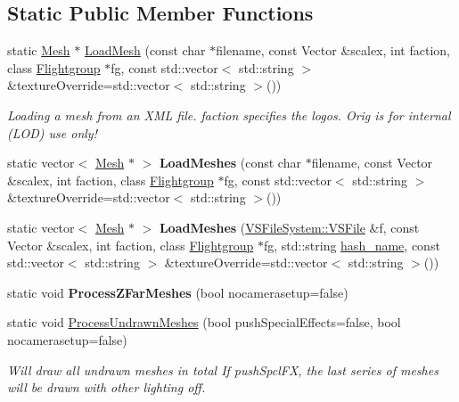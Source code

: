 \subsection*{Static Public Member Functions}
\begin{DoxyCompactItemize}
\item 
static \hyperlink{classMesh}{Mesh} $\ast$ \hyperlink{classMesh_a41fda8d598b4f20153b020c2d3f38839}{Load\+Mesh} (const char $\ast$filename, const Vector \&scalex, int faction, class \hyperlink{classFlightgroup}{Flightgroup} $\ast$fg, const std\+::vector$<$ std\+::string $>$ \&texture\+Override=std\+::vector$<$ std\+::string $>$())\hypertarget{classMesh_a41fda8d598b4f20153b020c2d3f38839}{}\label{classMesh_a41fda8d598b4f20153b020c2d3f38839}

\begin{DoxyCompactList}\small\item\em Loading a mesh from an X\+ML file. faction specifies the logos. Orig is for internal (L\+OD) use only! \end{DoxyCompactList}\item 
static vector$<$ \hyperlink{classMesh}{Mesh} $\ast$ $>$ {\bfseries Load\+Meshes} (const char $\ast$filename, const Vector \&scalex, int faction, class \hyperlink{classFlightgroup}{Flightgroup} $\ast$fg, const std\+::vector$<$ std\+::string $>$ \&texture\+Override=std\+::vector$<$ std\+::string $>$())\hypertarget{classMesh_a53082909aa7539f0b0c244e474d462a1}{}\label{classMesh_a53082909aa7539f0b0c244e474d462a1}

\item 
static vector$<$ \hyperlink{classMesh}{Mesh} $\ast$ $>$ {\bfseries Load\+Meshes} (\hyperlink{classVSFileSystem_1_1VSFile}{V\+S\+File\+System\+::\+V\+S\+File} \&f, const Vector \&scalex, int faction, class \hyperlink{classFlightgroup}{Flightgroup} $\ast$fg, std\+::string \hyperlink{classMesh_a1e30f4793443788927376dd02d7bb918}{hash\+\_\+name}, const std\+::vector$<$ std\+::string $>$ \&texture\+Override=std\+::vector$<$ std\+::string $>$())\hypertarget{classMesh_adf213fba862e7be4ee62d1f683b95105}{}\label{classMesh_adf213fba862e7be4ee62d1f683b95105}

\item 
static void {\bfseries Process\+Z\+Far\+Meshes} (bool nocamerasetup=false)\hypertarget{classMesh_ab7eff87ab1f5a89b4f9aea1b2fc91c2f}{}\label{classMesh_ab7eff87ab1f5a89b4f9aea1b2fc91c2f}

\item 
static void \hyperlink{classMesh_ab00de322e0cefefc7d4948f54d853736}{Process\+Undrawn\+Meshes} (bool push\+Special\+Effects=false, bool nocamerasetup=false)\hypertarget{classMesh_ab00de322e0cefefc7d4948f54d853736}{}\label{classMesh_ab00de322e0cefefc7d4948f54d853736}

\begin{DoxyCompactList}\small\item\em Will draw all undrawn meshes in total If push\+Spcl\+FX, the last series of meshes will be drawn with other lighting off. \end{DoxyCompactList}\end{DoxyCompactItemize}
